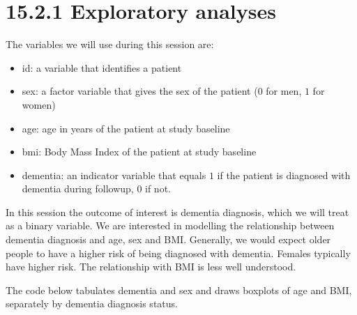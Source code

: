 \documentclass[letterpaper,10pt,english]{jupyterBook}
\begin{document}
\section{15.2.1 Exploratory analyses}
\label{\detokenize{15.c. Logistic Regression:exploratory-analyses}}
\sphinxAtStartPar
The variables we will use during this session are:
\begin{itemize}
\item {} 
\sphinxAtStartPar
id: a variable that identifies a patient

\item {} 
\sphinxAtStartPar
sex: a factor variable that gives the sex of the patient (\(0\) for men, \(1\) for women)

\item {} 
\sphinxAtStartPar
age: age in years of the patient at study baseline

\item {} 
\sphinxAtStartPar
bmi: Body Mass Index of the patient at study baseline

\item {} 
\sphinxAtStartPar
dementia: an indicator variable that equals \(1\) if the patient is diagnosed with dementia during follow\sphinxhyphen{}up, \(0\) if not.

\end{itemize}

\sphinxAtStartPar
In this session the outcome of interest is dementia diagnosis, which we will treat as a binary variable. We are interested in modelling the relationship between dementia diagnosis and age, sex and BMI. Generally, we would expect older people to have a higher risk of being diagnosed with dementia. Females typically have higher risk. The relationship with BMI is less well understood.

\sphinxAtStartPar
The code below tabulates dementia and sex and draws box\sphinxhyphen{}plots of age and BMI, separately by dementia diagnosis status.
\end{document}
